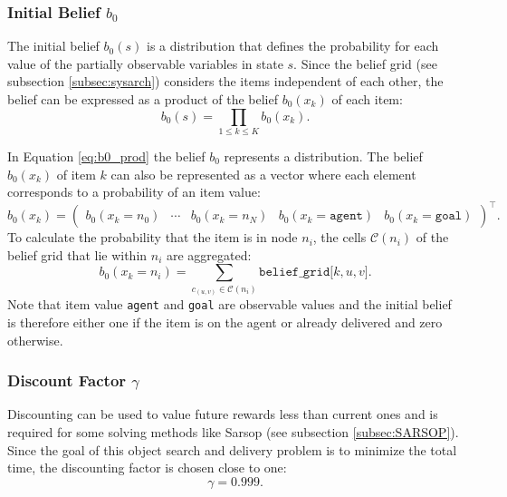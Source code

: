 \subsubsection{Initial Belief $b_0$}
The initial belief $b_0(s)$ is a distribution that defines the probability for each value of the partially observable variables in state $s$. Since the belief grid (see subsection \ref{subsec:sysarch}) considers the items independent of each other, the belief can be expressed as a product of the belief $b_0(x_k)$ of each item:
\begin{equation}\label{eq:b0_prod}
    b_0(s) = \prod_{1\leq k\leq K} b_0(x_k).
\end{equation}

In Equation \ref{eq:b0_prod} the belief $b_0$ represents a distribution. The belief $b_0(x_k)$ of item $k$ can also be represented as a vector where each element corresponds to a probability of an item value:
\begin{equation}
    b_0(x_k) = \begin{pmatrix} b_0(x_k=n_0) & \cdots & b_0(x_k=n_N) & b_0(x_k=\texttt{agent}) & b_0(x_k=\texttt{goal}) \end{pmatrix}^\intercal.
\end{equation}
To calculate the probability that the item is in node $n_i$, the cells $\mathcal{C}(n_i)$ of the belief grid that lie within $n_i$ are aggregated:
\begin{equation}
b_0\left(x_k=n_i\right) = \sum_{c_{(u,v)}\in \mathcal{C}(n_i)}\texttt{belief\_grid[$k, u, v$]}.
\end{equation}
Note that item value \texttt{agent} and \texttt{goal} are observable values and the initial belief is therefore either one if the item is on the agent or already delivered and zero otherwise. 
\subsubsection{Discount Factor $\gamma$}
Discounting can be used to value future rewards less than current ones and is required for some solving methods like Sarsop (see subsection \ref{subsec:SARSOP}). Since the goal of this object search and delivery problem is to minimize the total time, the discounting factor is chosen close to one:
\begin{equation}
    \gamma = 0.999.
\end{equation}
